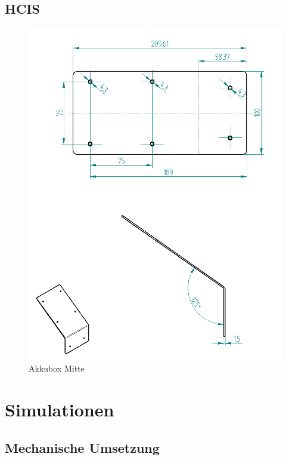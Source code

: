 \section{HCIS} \label{app:hcis}
\begin{figure} [H]
	\begin{center}
		\includegraphics[scale=0.8]{figures/hcis/befestigung_display_cad.png}
		\caption{Akkubox Mitte}
		\label{fig:panel_cad}
	\end{center}
\end{figure}

\chapter{Simulationen}

\section{Mechanische Umsetzung}

